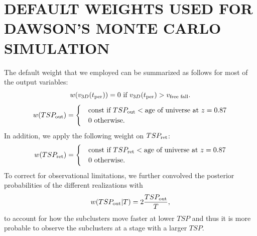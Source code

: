 \documentclass[letterpaper,useAMS,usenatbib]{mn2e}
\begin{document}
\section{DEFAULT WEIGHTS USED FOR DAWSON'S MONTE CARLO SIMULATION}
\label{app:priors}
The default weight that we employed can be summarized as
follows for most of the output variables: 
\begin{equation}
	w(v_{3D}(t_{\rm per})) = 0\text{ if }v_{3D}(t_{\rm per}) >
	v_{\text{free fall}}. 
\end{equation}
\begin{equation}
	w(TSP_{\rm out}) = 
	\begin{cases}
		& \text{const}~\text{if }TSP_{\rm out} < \text{age of universe at } z=0.87	\\
		& 0~\text{otherwise}.
	\end{cases}
\end{equation}
In addition, we apply the following weight on $TSP_{\rm ret}$:
\begin{equation}
	w(TSP_{\rm ret}) = 
	\begin{cases}
		& \text{const}~\text{if }TSP_{\rm ret} < \text{age of universe at } z=0.87	\\
		& 0~\text{otherwise} \label{eqn:TSM_1}.
	\end{cases}
\end{equation}
To correct for observational limitations, we further convolved the
posterior probabilities of the different realizations with 
\begin{equation}
	w(TSP_{\rm out} | T) = 2 \frac{TSP_{\rm out}}{T},
\end{equation}
to account for how the subclusters move faster at lower $TSP$ and thus it
is more probable to observe the subclusters at a stage with a larger $TSP$.
\par 
\end{document}
